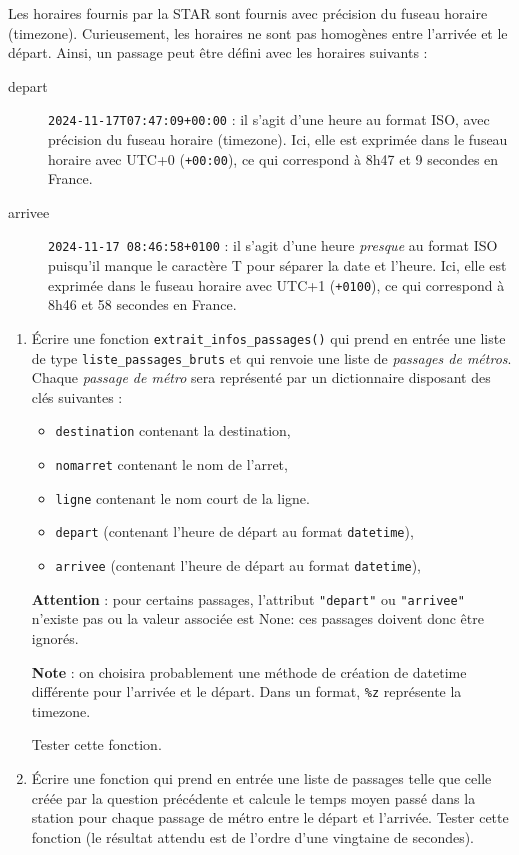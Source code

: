 \documentclass[11pt,a4paper]{article}
\begin{document}
Les horaires fournis par la STAR sont fournis avec précision du fuseau horaire (timezone). Curieusement, les horaires ne sont pas homogènes entre l'arrivée et le départ.
Ainsi, un passage peut être défini avec les horaires suivants : 
\begin{description}
    \item[depart] \verb'2024-11-17T07:47:09+00:00' : il s'agit d'une heure au format ISO, avec précision du fuseau horaire (timezone). Ici, elle est exprimée dans le fuseau horaire avec UTC+0 (\verb'+00:00'), ce qui correspond à 8h47 et 9 secondes en France.
    \item[arrivee] \verb'2024-11-17 08:46:58+0100' : il s'agit d'une heure \emph{presque} au format ISO puisqu'il manque le caractère T pour séparer la date et l'heure. Ici, elle est exprimée dans le fuseau horaire avec UTC+1 (\verb'+0100'), ce qui correspond à 8h46 et 58 secondes en France.
\end{description}


\begin{enumerate}
    \item Écrire une fonction \verb+extrait_infos_passages()+ qui prend en entrée une liste de type \verb+liste_passages_bruts+ et qui renvoie une liste de \emph{passages de métros}. Chaque \emph{passage de métro} sera représenté par un dictionnaire disposant des clés suivantes : 
    
    \begin{itemize}
        \item \verb+destination+ contenant la destination,
        \item \verb+nomarret+ contenant le nom de l'arret,
        \item \verb+ligne+ contenant le nom court de la ligne.
        \item \verb+depart+ (contenant l'heure de départ au format \verb+datetime+), 
        \item \verb+arrivee+ (contenant l'heure de départ au format \verb+datetime+), 
    \end{itemize}
        \textbf{Attention} : pour certains passages, l'attribut \verb+"depart"+ ou \verb+"arrivee"+ n'existe pas ou la valeur associée est None: ces passages doivent donc être ignorés.

        \textbf{Note} : on choisira probablement une méthode de création de datetime différente pour l'arrivée et le départ. Dans un format, \verb+%z+ représente la timezone.
    
        Tester cette fonction.
    \item Écrire une fonction qui prend en entrée une liste de passages telle que celle créée par la question 
    précédente et calcule le temps moyen passé dans la station pour chaque passage de métro entre le départ et l'arrivée.  Tester cette fonction (le résultat attendu est de l'ordre d'une vingtaine de secondes).
\end{enumerate}
\end{document}
